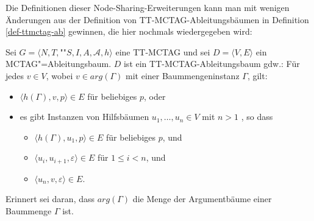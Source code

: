 Die Definitionen dieser Node-Sharing-Erweiterungen kann man mit wenigen Änderungen aus der Definition von TT-MCTAG-Ableitungsbäumen in Definition \ref{def-ttmctag-ab} gewinnen, die hier nochmals wiedergegeben wird:  
\begin{definition}
Sei $G = \langle N,T,$""$S,I,A,\mathcal{A},h \rangle$ eine TT-MCTAG und sei $D=\langle V,E \rangle$ ein MCTAG"=Ableitungsbaum. \linebreak $D$ ist ein TT-MCTAG-Ablei\-tungs\-baum gdw.:
Für jedes $v \in V$, wobei $v \in arg(\Gamma)$ mit einer Baummengeninstanz $\Gamma$, gilt:
\begin{itemize} 
  \item $\langle h(\Gamma),v,p \rangle \in E$ für beliebiges $p$, oder
  \item es gibt Instanzen von Hilfsbäumen $u_1, \ldots, u_n \in V$ mit $n>1$ , so dass
  \begin{itemize}
    \item $\langle h(\Gamma),u_1,p \rangle \in E$ für beliebiges $p$, und
    \item $\langle u_i,u_{i+1},\varepsilon \rangle \in E$ für $1 \leq i < n$, und
    \item $\langle u_n,v,\varepsilon \rangle \in E$.
  \end{itemize}
\end{itemize}  
\end{definition}
Erinnert sei daran, dass $arg(\Gamma)$ die Menge der Argumentbäume einer Baummenge $\Gamma$ ist.

